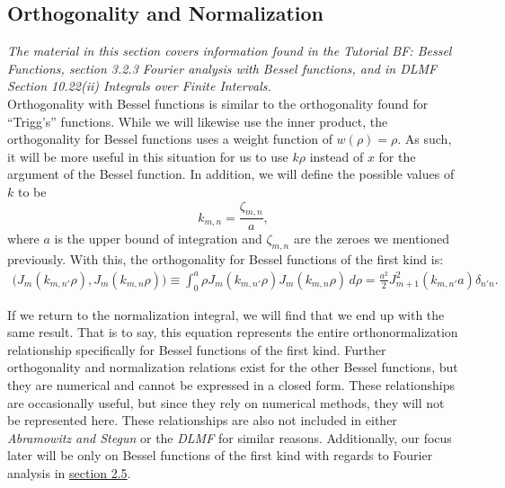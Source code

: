 \documentclass[11pt]{report}
\newcommand{\fpar}[1]{\left({#1}\right)}
\begin{document}
\subsection{Orthogonality and Normalization}

\emph{The material in this section covers information found in the Tutorial BF: Bessel Functions, section 3.2.3 Fourier analysis with Bessel functions, and in DLMF Section 10.22(ii) Integrals over Finite Intervals.}\\

Orthogonality with Bessel functions is similar to the orthogonality found for ``Trigg's'' functions. While we will likewise use the inner product, the orthogonality for Bessel functions uses a weight function of $w(\rho)=\rho$. As such, it will be more useful in this situation for us to use $k\rho$ instead of $x$ for the argument of the Bessel function. In addition, we will define the possible values of $k$ to be
    \begin{equation}
        k_{m,n} = \frac{\zeta_{m,n}}{a},
    \end{equation}
where $a$ is the upper bound of integration and $\zeta_{m,n}$ are the zeroes we mentioned previously. With this, the orthogonality for Bessel functions of the first kind is:
    \begin{align}
        \bigg(J_m\fpar{k_{m,n'}\rho},J_m\fpar{k_{m,n}\rho}\bigg) \equiv \int_0^a\rho J_m\fpar{k_{m,n'}\rho}J_m\fpar{k_{m,n}\rho}\,d\rho = \frac{a^2}{2}J^2_{m+1}\fpar{k_{m,n'}a}\delta_{n'n}.
    \end{align}
    

If we return to the normalization integral, we will find that we end up with the same result. That is to say, this equation represents the entire orthonormalization relationship specifically for Bessel functions of the first kind. Further orthogonality and normalization relations exist for the other Bessel functions, but they are numerical and cannot be expressed in a closed form. These relationships are occasionally useful, but since they rely on numerical methods, they will not be represented here. These relationships are also not included in either \emph{Abramowitz and Stegun} or the \emph{DLMF} for similar reasons. Additionally, our focus later will be only on Bessel functions of the first kind with regards to Fourier analysis in \hyperlink{section.2.5}{section 2.5}.
\end{document}
